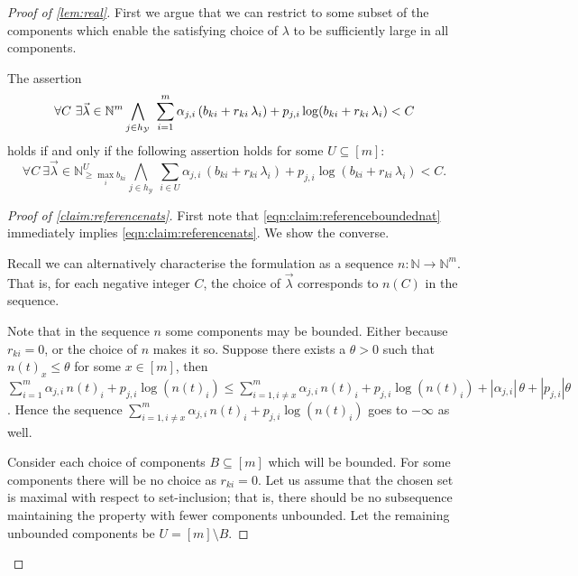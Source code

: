 \documentclass[10pt,a4paper]{amsart}
\numberwithin{equation}{section}
\theoremstyle{plain}
\theoremstyle{definition}
\theoremstyle{remark}
\newenvironment{subproof}[1][\proofname]{\renewcommand{\qedsymbol}{{$\blacksquare$}}\begin{proof}[#1]}{\end{proof}}
\newcommand\basevecraw{b}
\newcommand\pvecraw{r}
\begin{document}
\begin{proof}[Proof of \cref{lem:real}]

First we argue that we can restrict to some subset of the components which enable the satisfying choice of $\lambda$ to be sufficiently large in all components.
\begin{clm} \label{claim:referencenats}
The assertion
\begin{equation}\label{eqn:claim:referencenats}
\forall C\  \exists \vec{\lambda} \in \mathbb{N}^m \\
\bigwedge_{j \in h_\mathcal{Y}}\ \sum_{i=1}^m \alpha_{j,i}\, (\basevecraw_{ki} + \pvecraw_{ki} \, \lambda_i) +  p_{j,i}\log(\basevecraw_{ki} + \pvecraw_{ki}\, \lambda_i) < C
\end{equation}
 holds if and only if the following assertion holds for some $U \subseteq [m]$:\begin{equation}\label{eqn:claim:referenceboundednat}
\forall C\  \exists \vec{\lambda} \in \mathbb{N}^{U}_{\ge \max_i{\basevecraw_{ki}}}
\bigwedge_{j \in h_\mathcal{Y}}\ \sum_{i \in U} \alpha_{j,i}\, (\basevecraw_{ki} + \pvecraw_{ki}\, \lambda_i) +  p_{j,i}\log(\basevecraw_{ki} + \pvecraw_{ki}\, \lambda_i) < C.
\end{equation}
\end{clm}
\begin{subproof}[Proof of \cref{claim:referencenats}]

First note that \cref{eqn:claim:referenceboundednat} immediately implies \cref{eqn:claim:referencenats}. We show the converse.

Recall we can alternatively characterise the formulation as a sequence $n: \mathbb{N} \to \mathbb{N}^m$. That is, for each negative integer $C$, the choice of  $\vec{\lambda}$ corresponds to $n(C)$ in the sequence.

Note that in the sequence $n$ some components may be bounded. Either because $\pvecraw_{ki}=0$, or the choice of $n$ makes it so. Suppose there exists a $\theta >0$ such that $n(t)_x \le \theta$ for some $x \in [m]$, then  $\sum_{i = 1}^m \alpha_{j,i}\, n(t)_i +  p_{j,i}\log(n(t)_i) \le \sum_{i = 1, i\ne x}^m \alpha_{j,i}\, n(t)_i +  p_{j,i}\log(n(t)_i) + |\alpha_{j,i}|\, \theta +  |p_{j,i}|\theta$. Hence the sequence  $\sum_{i = 1, i\ne x}^m \alpha_{j,i}\, n(t)_i +  p_{j,i}\log(n(t)_i)$ goes to $-\infty$ as well.

Consider each choice of components $B \subseteq [m]$ which will be bounded. For some components there will be no choice as $\pvecraw_{ki} = 0$. Let us assume that the chosen set is maximal with respect to set-inclusion; that is, there should be no subsequence maintaining the property with fewer components unbounded. Let the remaining unbounded components be $U = [m] \setminus B$.


\end{subproof}
\end{proof}
\end{document}
